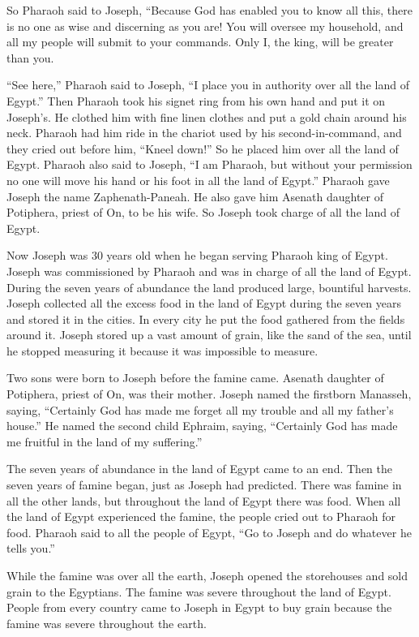 {So Pharaoh
said
to Joseph,
“Because God
has enabled
you to know
all
this,
there is no
one as wise
and discerning
as you are!
You
will
oversee
my
household,
and all
my people
will submit to your commands. Only
I, the king,
will be greater
than you.
\par }{\PP {}“See
here,” Pharaoh
said
to
Joseph,
“I place
you in authority over
all
the land
of Egypt.”
Then Pharaoh
took
his signet ring
from his own hand
and put
it on
Joseph’s.
He clothed
him with fine linen
clothes
and put
a gold
chain
around
his neck.
Pharaoh had him ride
in the chariot
used by
his second-in-command,
and they cried out
before
him, “Kneel
down!” So he placed
him over
all
the land
of Egypt.
Pharaoh
also said
to
Joseph,
“I am
Pharaoh,
but without your permission
no
one
will move
his hand
or his foot
in all
the land
of Egypt.”
Pharaoh
gave Joseph
the name
Zaphenath-Paneah.
He also gave
him Asenath
daughter
of Potiphera,
priest
of On,
to be his wife.
So
Joseph
took charge
of all the land
of Egypt.
\par }{\PP {}Now Joseph
was 30
years
old when
he began serving
Pharaoh
king
of Egypt.
Joseph
was commissioned by
Pharaoh
and was in charge of all
the land
of Egypt.
During the seven
years
of abundance
the land
produced
large, bountiful harvests.
Joseph collected
all
the excess food
in the land
of Egypt
during the seven
years
and stored
it
in the cities.
In every city
he put the food
gathered
from the fields
around
it.
Joseph
stored up
a vast
amount
of grain,
like the sand
of the sea,
until
he stopped
measuring
it because
it was impossible
to measure.
\par }{\PP {}Two
sons
were born
to Joseph
before
the famine
came.
Asenath
daughter
of Potiphera,
priest
of On,
was their mother.
Joseph
named
the firstborn
Manasseh,
saying, “Certainly
God
has made me forget
all
my trouble
and all
my father’s
house.”
He named
the second
child
Ephraim,
saying, “Certainly
God
has made me fruitful
in the land
of my suffering.”
\par }{\PP {}The seven
years
of abundance
in the land
of Egypt
came to an end.
Then the seven
years
of famine
began,
just
as Joseph
had predicted.
There was
famine
in all
the other lands,
but throughout
the land
of Egypt
there was
food.
When all
the land
of Egypt
experienced
the famine, the people
cried out
to
Pharaoh
for food.
Pharaoh
said
to all
the people of Egypt, “Go
to
Joseph
and do
whatever
he tells you.”
\par }{\PP {}While the famine
was
over
all
the earth,
Joseph
opened
the storehouses and sold
grain to the Egyptians.
The famine
was severe
throughout the land
of Egypt.
People from every
country
came
to
Joseph
in Egypt
to buy
grain because
the famine
was severe
throughout
the earth.

}
